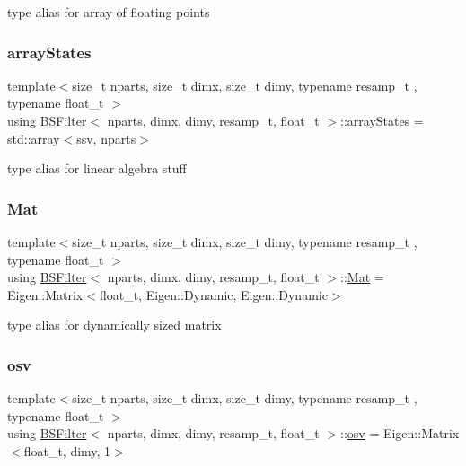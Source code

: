 type alias for array of floating points \mbox{\label{classBSFilter_a0afe61a08de8d178647b23beae9eef16}} 
\subsubsection{\texorpdfstring{array\+States}{arrayStates}}
{\footnotesize\ttfamily template$<$size\+\_\+t nparts, size\+\_\+t dimx, size\+\_\+t dimy, typename resamp\+\_\+t , typename float\+\_\+t $>$ \\
using \hyperlink{classBSFilter}{B\+S\+Filter}$<$ nparts, dimx, dimy, resamp\+\_\+t, float\+\_\+t $>$\+::\hyperlink{classBSFilter_a0afe61a08de8d178647b23beae9eef16}{array\+States} =  std\+::array$<$\hyperlink{classBSFilter_a0b5bc93957fb6b6b1282f31fa2e01c3c}{ssv}, nparts$>$}

type alias for linear algebra stuff \mbox{\label{classBSFilter_a8ec8e8477e12686e706e7d7aa5c2971c}} 
\subsubsection{\texorpdfstring{Mat}{Mat}}
{\footnotesize\ttfamily template$<$size\+\_\+t nparts, size\+\_\+t dimx, size\+\_\+t dimy, typename resamp\+\_\+t , typename float\+\_\+t $>$ \\
using \hyperlink{classBSFilter}{B\+S\+Filter}$<$ nparts, dimx, dimy, resamp\+\_\+t, float\+\_\+t $>$\+::\hyperlink{classBSFilter_a8ec8e8477e12686e706e7d7aa5c2971c}{Mat} =  Eigen\+::\+Matrix$<$float\+\_\+t, Eigen\+::\+Dynamic, Eigen\+::\+Dynamic$>$}

type alias for dynamically sized matrix \mbox{\label{classBSFilter_ad8512328484d7c7bd7a3b7a9481d7f37}} 
\subsubsection{\texorpdfstring{osv}{osv}}
{\footnotesize\ttfamily template$<$size\+\_\+t nparts, size\+\_\+t dimx, size\+\_\+t dimy, typename resamp\+\_\+t , typename float\+\_\+t $>$ \\
using \hyperlink{classBSFilter}{B\+S\+Filter}$<$ nparts, dimx, dimy, resamp\+\_\+t, float\+\_\+t $>$\+::\hyperlink{classBSFilter_ad8512328484d7c7bd7a3b7a9481d7f37}{osv} =  Eigen\+::\+Matrix$<$float\+\_\+t, dimy, 1$>$}


